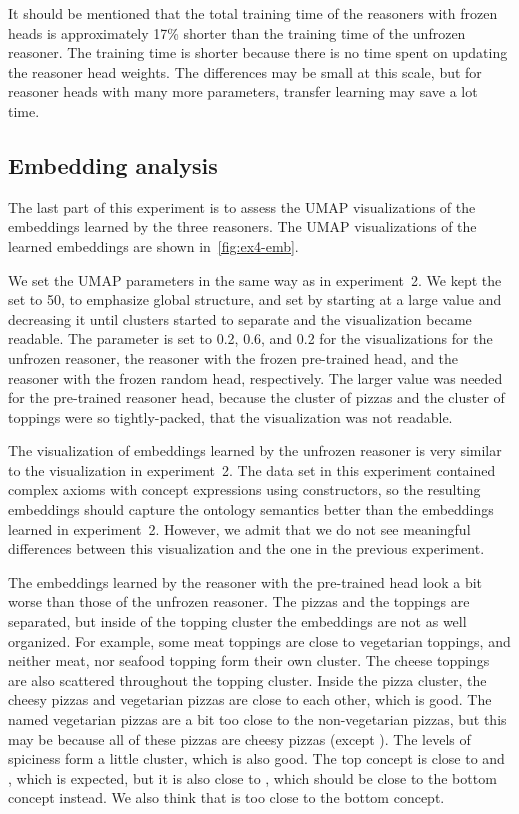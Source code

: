 It should be mentioned that the total training time of the reasoners with frozen heads is approximately 17\% shorter than the training time of the unfrozen reasoner.
The training time is shorter because there is no time spent on updating the reasoner head weights.
The differences may be small at this scale, but for reasoner heads with many more parameters, transfer learning may save a lot time.

\subsection{Embedding analysis}

The last part of this experiment is to assess the UMAP visualizations of the embeddings learned by the three reasoners.
The UMAP visualizations of the learned embeddings are shown in~\autoref{fig:ex4-emb}.

We set the UMAP parameters in the same way as in experiment~2.
We kept the  set to 50, to emphasize global structure, and set  by starting at a large value and decreasing it until clusters started to separate and the visualization became readable.
The  parameter is set to 0.2, 0.6, and 0.2 for the visualizations for the unfrozen reasoner, the reasoner with the frozen pre-trained head, and the reasoner with the frozen random head, respectively.
The larger  value was needed for the pre-trained reasoner head, because the cluster of pizzas and the cluster of toppings were so tightly-packed, that the visualization was not readable.

The visualization of embeddings learned by the unfrozen reasoner is very similar to the visualization in experiment~2.
The data set in this experiment contained complex axioms with concept expressions using constructors, so the resulting embeddings should capture the ontology semantics better than the embeddings learned in experiment~2.
However, we admit that we do not see meaningful differences between this visualization and the one in the previous experiment.

The embeddings learned by the reasoner with the pre-trained head look a bit worse than those of the unfrozen reasoner.
The pizzas and the toppings are separated, but inside of the topping cluster the embeddings are not as well organized.
For example, some meat toppings are close to vegetarian toppings, and neither meat, nor seafood topping form their own cluster.
The cheese toppings are also scattered throughout the topping cluster.
Inside the pizza cluster, the cheesy pizzas and vegetarian pizzas are close to each other, which is good.
The named vegetarian pizzas are a bit too close to the non-vegetarian pizzas, but this may be because all of these pizzas are cheesy pizzas (except ).
The levels of spiciness form a little cluster, which is also good. 
The top concept is close to  and , which is expected, but it is also close to , which should be close to the bottom concept instead.
We also think that  is too close to the bottom concept.

